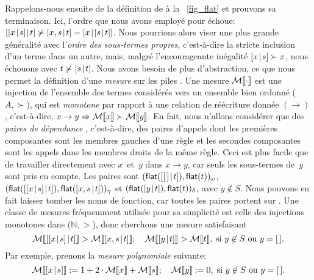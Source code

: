 \par\vspace\baselineskip

Rappelons-nous ensuite de la définition de
 à la \fig~\vref{fig_flat} et
prouvons sa terminaison. Ici, l'ordre que nous avons employé pour
 échoue: \(\cons{\cons{x}{s}}{t} \nsucc
\cons{x,s}{t} = \cons{x}{\cons{s}{t}}\). Nous pourrions alors viser
une plus grande généralité avec l'\emph{ordre des sous-termes
  propres},
c'est-à-dire la stricte inclusion d'un terme dans un autre, mais,
malgré l'encourageante inégalité \([{x}\!\mid\!{s}] \succ x\), nous
échouons avec \(t \nsucc [{s}\!\mid\!{t}]\). Nous avons besoin de plus
d'abstraction, ce que nous permet la définition d'une
\emph{mesure} sur les piles
\citep{Giesl_1995a}. Une mesure \(\mathcal{M}\llbracket{\cdot}\rrbracket\) est une injection de l'ensemble des
termes considérés vers un ensemble bien ordonné (\(A,\succ\)), qui est
\emph{monotone} par rapport à une relation de réécriture donnée
\((\rightarrow)\), c'est-à-dire, \(x \rightarrow y \Rightarrow
\mathcal{M}\llbracket{x}\rrbracket \succ \mathcal{M}\llbracket{y}\rrbracket\). En fait, nous n'allons considérer que
des \emph{paires de dépendance}
\citep{ArtsGiesl_2000},
c'est-à-dire, des paires d'appels dont les premières composantes sont
les membres gauches d'une règle et les secondes composantes sont les
appels dans les membres droits de la même règle. Ceci est plus facile
que de travailler directement avec \(x\)~et~\(y\) dans \(x \rightarrow
y\), car seuls les sous-termes de~\(y\) sont pris en compte. Les
paires sont \((\textsf{flat}([{[\,]}\!\mid\!{t}]),
\textsf{flat}(t))_\omega\), \((\textsf{flat}([{[{x}\!\mid\!{s}]}\!\mid\!{t}]),
\textsf{flat}([{x,s}\!\mid\!{t}]))_\gamma\) et \((\textsf{flat}([{y}\!\mid\!{t}]),
\textsf{flat}(t))_\delta\), avec \(y \not\in S\). Nous pouvons en fait
laisser tomber les noms de fonction, car toutes les paires portent sur
. Une classe de mesures
fréquemment utilisée pour sa simplicité est celle des injections
monotones dans (\(\mathbb{N},>\)), donc cherchons une mesure
satisfaisant
\begin{equation*}
\measure{\cons{\cons{x}{s}}{t}} > \measure{\cons{x,s}{t}};\quad
\measure{\cons{y}{t}} > \measure{t},
\;\text{si \(y \not\in S\) ou \(y=\el\)}.
\end{equation*}
Par exemple, prenons la \emph{mesure polynomiale} suivante:
\begin{equation*}
\mathcal{M}\llbracket{[{x}\!\mid\!{s}]}\rrbracket := 1 + 2\cdot\mathcal{M}\llbracket{x}\rrbracket + \mathcal{M}\llbracket{s}\rrbracket;\quad
\mathcal{M}\llbracket{y}\rrbracket := 0,\;\text{si \(y \not\in S\) ou \(y=[\,]\)}.
\end{equation*}

